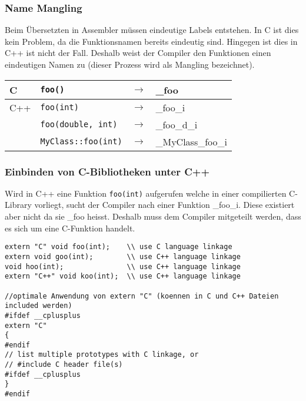 \subsubsection{Name Mangling} 
\begin{multicols}{2} 
	Beim Übersetzten in Assembler müssen eindeutige Labels entstehen. In C ist dies kein Problem, da die Funktionsnamen bereits eindeutig sind. Hingegen ist dies in C++ ist nicht der Fall. Deshalb weist der Compiler den Funktionen einen eindeutigen Namen zu (dieser Prozess wird als Mangling bezeichnet).
\columnbreak
  \begin{tabular}{|l|lll|}
  \hline
    C   & {\lstinline!foo()!} & $\rightarrow$ & \_foo \\
  \hline
    C++ & {\lstinline!foo(int)!} & $\rightarrow$ & \_foo\_i \\
        & {\lstinline!foo(double, int)!} & $\rightarrow$ & \_foo\_d\_i \\
        & {\lstinline!MyClass::foo(int)!} & $\rightarrow$ & \_MyClass\_foo\_i \\
  \hline
  \end{tabular}
\end{multicols}
  
\subsubsection{Einbinden von C-Bibliotheken unter C++}
Wird in C++ eine Funktion \lstinline{foo(int)} aufgerufen welche in einer compilierten C-Library vorliegt, sucht der Compiler nach einer Funktion \_foo\_i. Diese existiert aber nicht da sie \_foo heisst. Deshalb muss dem Compiler mitgeteilt werden, dass es sich um eine C-Funktion handelt.\\
  
\begin{lstlisting}[style=Cpp]
extern "C" void foo(int);    \\ use C language linkage
extern void goo(int);        \\ use C++ language linkage
void hoo(int);               \\ use C++ language linkage
extern "C++" void koo(int);  \\ use C++ language linkage

//optimale Anwendung von extern "C" (koennen in C und C++ Dateien included werden)
#ifdef __cplusplus
extern "C"
{
#endif
// list multiple prototypes with C linkage, or
// #include C header file(s)
#ifdef __cplusplus
}
#endif
\end{lstlisting}
